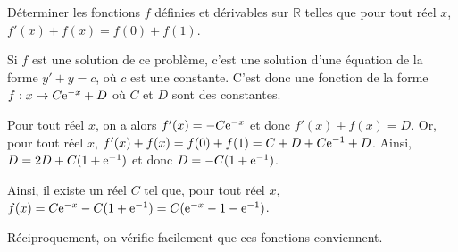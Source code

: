 \documentclass[11pt,fleqn, openany]{book} %
\begin{document}
\begin{exercise}[topic=diff04]Déterminer les fonctions $f$ définies et dérivables sur $\mathbb{R}$ telles que pour tout réel $x$, $f'(x)+f(x)=f(0)+f(1)$.\end{exercise}

\begin{solution}
Si $f$ est une solution de ce problème, c'est une solution d'une équation de la forme $y'+y=c$, où $c$ est une constante. C'est donc une fonction de la forme $f:x\mapsto C\mathrm{e}^{-x}+D$ où $C$ et $D$ sont des constantes.

Pour tout réel $x$, on a alors $f'(x)=-C\mathrm{e}^{-x}$ et donc $f'(x)+f(x)=D$. Or, pour tout réel $x$, $f'(x)+f(x)=f(0)+f(1)=C+D+C\mathrm{e}^{-1}+D$. Ainsi, $D=2D+C(1+\mathrm{e}^{-1})$ et donc $D=-C(1+\mathrm{e}^{-1})$.

Ainsi, il existe un réel $C$ tel que, pour tout réel $x$, $f(x)=C\mathrm{e}^{-x}-C(1+\mathrm{e}^{-1})=C(\mathrm{e}^{-x}-1-\mathrm{e}^{-1})$.

Réciproquement, on vérifie facilement que ces fonctions conviennent.
\end{solution}
\end{document}
